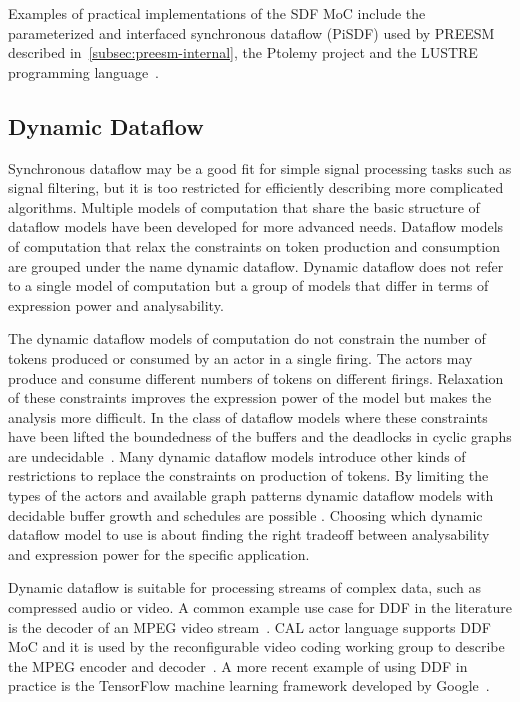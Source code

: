 Examples of practical implementations of the SDF MoC include the parameterized and interfaced synchronous dataflow (PiSDF) used by PREESM described in~\ref{subsec:preesm-internal}, the Ptolemy project \cite{ekerjanneck2003ptolemy} and the LUSTRE programming language~\cite{halbwachs1991synchronous}.

\FloatBarrier
\subsection{Dynamic Dataflow}
\label{subsec:dynamic-dataflow}
Synchronous dataflow may be a good fit for simple signal processing tasks such as signal filtering, but it is too restricted for efficiently describing more complicated algorithms. Multiple models of computation that share the basic structure of dataflow models have been developed for more advanced needs. Dataflow models of computation that relax the constraints on token production and consumption are grouped under the name dynamic dataflow. Dynamic dataflow does not refer to a single model of computation but a group of models that differ in terms of expression power and analysability.~\cite{bhattacharyya2013handbook}

The dynamic dataflow models of computation do not constrain the number of tokens produced or consumed by an actor in a single firing. The actors may produce and consume different numbers of tokens on different firings. Relaxation of these constraints improves the expression power of the model but makes the analysis more difficult. In the class of dataflow models where these constraints have been lifted the boundedness of the buffers and the deadlocks in cyclic graphs are undecidable~\cite{buck1993scheduling}. Many dynamic dataflow models introduce other kinds of restrictions to replace the constraints on production of tokens. By limiting the types of the actors and available graph patterns dynamic dataflow models with decidable buffer growth and schedules are possible \cite{bhattacharyya2013handbook, gao1992well}. Choosing which dynamic dataflow model to use is about finding the right tradeoff between analysability and expression power for the specific application.

Dynamic dataflow is suitable for processing streams of complex data, such as compressed audio or video. A common example use case for DDF in the literature is the decoder of an MPEG video stream~\cite{bhattacharyya2013handbook}. CAL actor language supports DDF MoC and it is used by the reconfigurable video coding working group to describe the MPEG encoder and decoder~\cite{bhattacharyya2011overview}. A more recent example of using DDF in practice is the TensorFlow machine learning framework developed by Google~\cite{tensorflow2015-whitepaper}.
